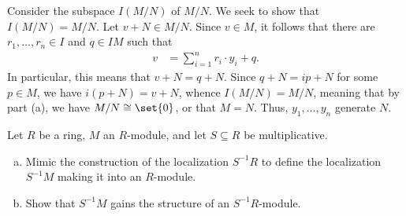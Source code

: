 \documentclass[10pt]{mypackage}
\begin{document}
\begin{solution}
\begin{enumerate}[(a)]
      Consider the subspace $I\left( M/N \right)$ of $M/N$. We seek to show that $I\left( M/N \right) = M/N$. Let $v + N\in M/N$. Since $v\in M$, it follows that there are $r_1,\dots,r_n\in I$ and $q\in IM$ such that
      \begin{align*}
        v &= \sum_{i=1}^{n} r_i\cdot y_i + q.
      \end{align*}
      In particular, this means that $v + N = q + N$. Since $q + N = ip + N$ for some $p\in M$, we have $i\left( p + N \right) = v + N$, whence $I\left( M/N \right) = M/N$, meaning that by part (a), we have $M/N\cong \set{0}$, or that $M = N$. Thus, $y_1,\dots,y_n$ generate $N$.
  \end{enumerate}
\end{solution}
\begin{problem}[Problem 6]
  Let $R$ be a ring, $M$ an $R$-module, and let $S\subseteq R$ be multiplicative.
  \begin{enumerate}[(a)]
    \item Mimic the construction of the localization $S^{-1}R$ to define the localization $S^{-1}M$ making it into an $R$-module.
    \item Show that $S^{-1}M$ gains the structure of an $S^{-1}R$-module.
  \end{enumerate}
\end{problem}
\end{document}
